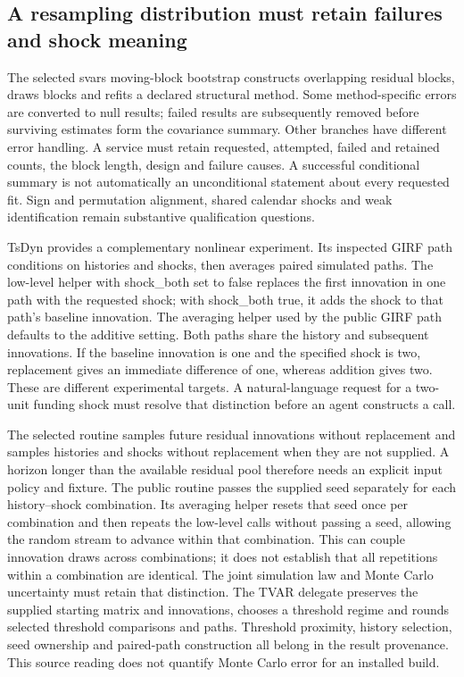 \subsection{A resampling distribution must retain failures and shock meaning}

The selected svars moving-block bootstrap constructs overlapping residual blocks, draws blocks and refits a declared structural method. Some method-specific errors are converted to null results; failed results are subsequently removed before surviving estimates form the covariance summary. Other branches have different error handling. A service must retain requested, attempted, failed and retained counts, the block length, design and failure causes. A successful conditional summary is not automatically an unconditional statement about every requested fit. Sign and permutation alignment, shared calendar shocks and weak identification remain substantive qualification questions.\citep{exec25_rdyn_svars}

TsDyn provides a complementary nonlinear experiment. Its inspected GIRF path conditions on histories and shocks, then averages paired simulated paths. The low-level helper with shock_both set to false replaces the first innovation in one path with the requested shock; with shock_both true, it adds the shock to that path's baseline innovation. The averaging helper used by the public GIRF path defaults to the additive setting. Both paths share the history and subsequent innovations. If the baseline innovation is one and the specified shock is two, replacement gives an immediate difference of one, whereas addition gives two. These are different experimental targets. A natural-language request for a two-unit funding shock must resolve that distinction before an agent constructs a call.\citep{exec25_rdyn_tsdyn,exec25_rdyn_choice}

The selected routine samples future residual innovations without replacement and samples histories and shocks without replacement when they are not supplied. A horizon longer than the available residual pool therefore needs an explicit input policy and fixture. The public routine passes the supplied seed separately for each history--shock combination. Its averaging helper resets that seed once per combination and then repeats the low-level calls without passing a seed, allowing the random stream to advance within that combination. This can couple innovation draws across combinations; it does not establish that all repetitions within a combination are identical. The joint simulation law and Monte Carlo uncertainty must retain that distinction. The TVAR delegate preserves the supplied starting matrix and innovations, chooses a threshold regime and rounds selected threshold comparisons and paths. Threshold proximity, history selection, seed ownership and paired-path construction all belong in the result provenance. This source reading does not quantify Monte Carlo error for an installed build.\citep{exec25_rdyn_tsdyn}

